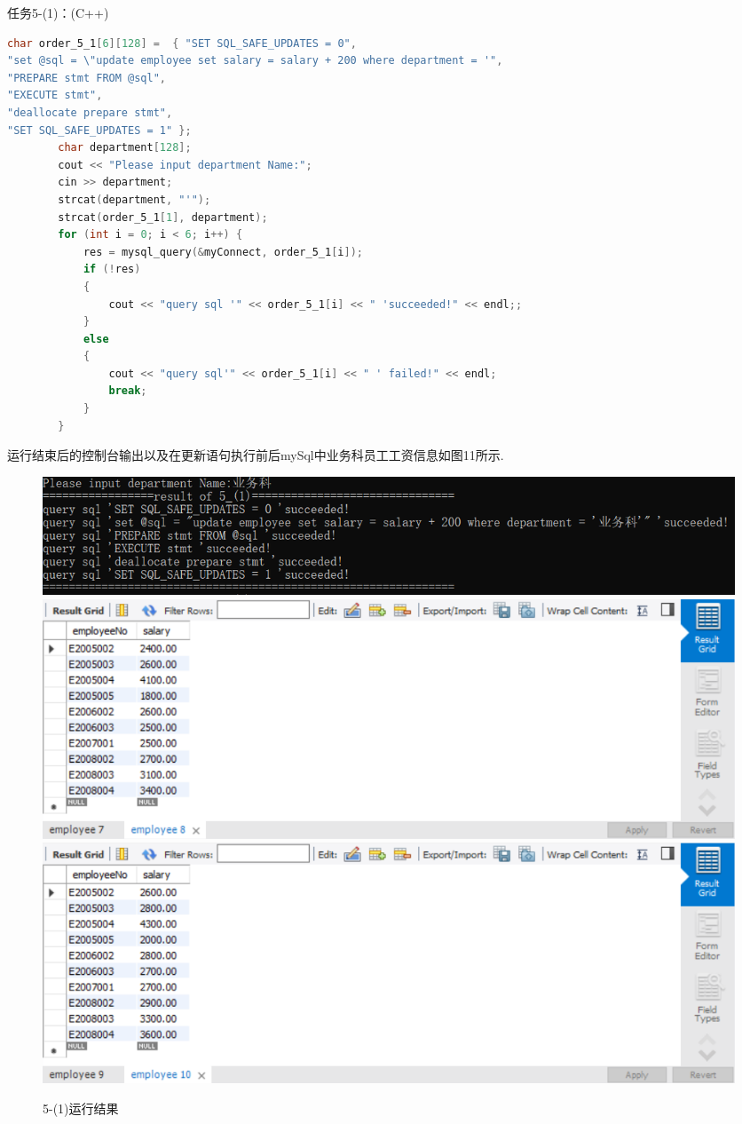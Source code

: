 \documentclass[a4paper,UTF8]{article}
\theoremstyle{definition}
\begin{document}
\begin{CJK}{UTF8}{gkai}
{\heiti \large 任务5-(1)：(C++)}
\begin{lstlisting}[language=C++]
char order_5_1[6][128] =  { "SET SQL_SAFE_UPDATES = 0",
"set @sql = \"update employee set salary = salary + 200 where department = '",
"PREPARE stmt FROM @sql",
"EXECUTE stmt",
"deallocate prepare stmt",
"SET SQL_SAFE_UPDATES = 1" };
        char department[128];
        cout << "Please input department Name:";
        cin >> department;
        strcat(department, "'");
        strcat(order_5_1[1], department);
        for (int i = 0; i < 6; i++) {
            res = mysql_query(&myConnect, order_5_1[i]);
            if (!res)
            {
                cout << "query sql '" << order_5_1[i] << " 'succeeded!" << endl;;
            }
            else
            {
                cout << "query sql'" << order_5_1[i] << " ' failed!" << endl;
                break;
            }
        }
\end{lstlisting}
\par 运行结束后的控制台输出以及在更新语句执行前后mySql中业务科员工工资信息如图11所示.
\begin{figure}[h]
\centering
\includegraphics[scale=0.7]{./img/5-1-1.png}
\includegraphics[scale=0.6]{./img/5-1-2.png}
\includegraphics[scale=0.6]{./img/5-1-3.png}
\caption{5-(1)运行结果}
\label{fig:label}
\end{figure}


\end{CJK}
\end{document}
